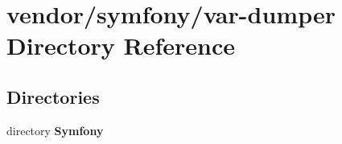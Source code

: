 \section{vendor/symfony/var-\/dumper Directory Reference}
\label{dir_846f0b843c7972c08627acab9addf8c7}
\subsection*{Directories}
\begin{DoxyCompactItemize}
\item 
directory {\bf Symfony}
\end{DoxyCompactItemize}
